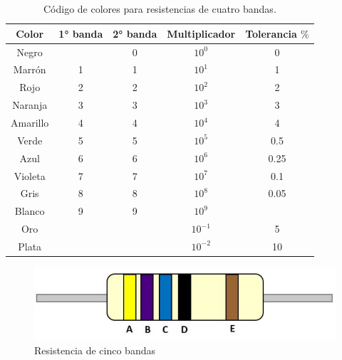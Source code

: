 \\
\\
\begin{table}[h]
	\begin{center}
		\begin{tabular}{|c | c | c | c |c|}
			\hline
			Color& 1° banda & 2° banda & Multiplicador & Tolerancia $ \% $\\
			\hline
			Negro& & 0 &$ 10^{0}$ & 0\\
			\hline
			Marrón & 1&1&$ 10^{1}$&1\\
			\hline
			Rojo & 2&2&$ 10^{2}$&2\\
			\hline
			Naranja & 3&3&$ 10^{3}$&3\\
			\hline
			Amarillo & 4&4&$ 10^{4}$&4\\
			\hline
			Verde & 5&5&$ 10^{5}$&0.5\\
			\hline
			Azul & 6&6&$ 10^{6}$&0.25\\
			\hline
			Violeta & 7&7&$ 10^{7}$&0.1\\
			\hline
			Gris & 8&8&$ 10^{8}$&0.05\\
			\hline
			Blanco & 9&9&$ 10^{9}$&\\
			\hline
			Oro & &&$ 10^{-1}$&5\\
			\hline
			Plata & &&$ 10^{-2}$&10\\
			\hline
		\end{tabular}
		\caption{Código de colores para resistencias de cuatro bandas.}
	\end{center}
\end{table}

\begin{figure}[h]
	\centering 
	\includegraphics[width=15cm]{imagenes/cincobandas}
	\caption{Resistencia de cinco bandas}
\end{figure}

